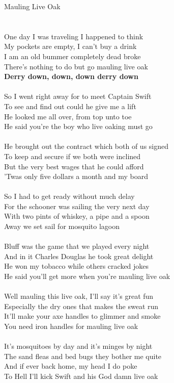 \documentclass[letterpaper,9pt]{article}
\begin{document}
\newpage
{}
\huge
Mauling Live Oak\\
\\
\Large
\\One day I was traveling I happened to think
\\My pockets are empty, I can't buy a drink
\\I am an old bummer completely dead broke
\\There's nothing to do but go mauling live oak
\\\textbf{Derry down, down, down derry down}
\\
\\So I went right away for to meet Captain Swift
\\To see and find out could he give me a lift
\\He looked me all over, from top unto toe
\\He said you're the boy who live oaking must go
\\
\\He brought out the contract which both of us signed
\\To keep and secure if we both were inclined
\\But the very best wages that he could afford
\\'Twas only five dollars a month and my board
\\
\\So I had to get ready without much delay
\\For the schooner was sailing the very next day
\\With two pints of whiskey, a pipe and a spoon
\\Away we set sail for mosquito lagoon
\\
\\Bluff was the game that we played every night
\\And in it Charles Douglas he took great delight
\\He won my tobacco while others cracked jokes
\\He said you'll get more when you're mauling live oak
\\
\\Well mauling this live oak, I'll say it's great fun
\\Especially the dry ones that makes the sweat run
\\It'll make your axe handles to glimmer and smoke
\\You need iron handles for mauling live oak
\\
\\It's mosquitoes by day and it's minges by night
\\The sand fleas and bed bugs they bother me quite
\\And if ever back home, my head I do poke
\\To Hell I'll kick Swift and his God damn live oak
\end{document}
